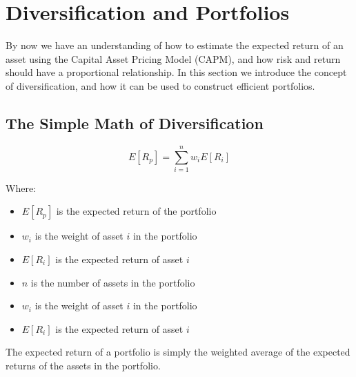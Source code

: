 \section{Diversification and Portfolios}
\label{sec:diversification_and_portfolios}

By now we have an understanding of how to estimate the expected return of an asset using the Capital Asset Pricing Model (CAPM), and 
how risk and return should have a proportional relationship. In this section we introduce the concept of diversification, and how it can be used to
construct efficient portfolios.

\subsection{The Simple Math of Diversification}
\begin{equation}
    \label{eq:portfolio_expected_return}
      E[R_p] = \sum_{i=1}^n w_i E[R_i]
\end{equation}

Where:
\begin{itemize}
    \item $E[R_p]$ is the expected return of the portfolio
    \item $w_i$ is the weight of asset $i$ in the portfolio
    \item $E[R_i]$ is the expected return of asset $i$
    \item $n$ is the number of assets in the portfolio
    \item $w_i$ is the weight of asset $i$ in the portfolio
    \item $E[R_i]$ is the expected return of asset $i$
\end{itemize}

The expected return of a portfolio is simply the weighted average of the expected returns of the assets in the portfolio.

